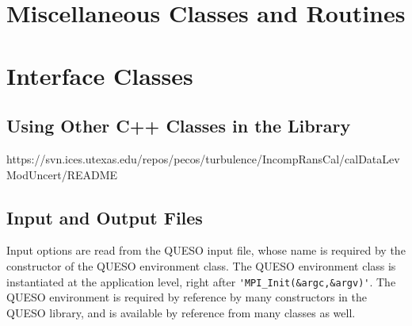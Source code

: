 \section{Miscellaneous Classes and Routines}

\section{Interface Classes}



\subsection{Using Other C++ Classes in the Library}

https://svn.ices.utexas.edu/repos/pecos/turbulence/IncompRansCal/calDataLevModUncert/README


\subsection{Input and Output Files}

Input options are read from the QUESO input file, whose name is required by the constructor of the QUESO environment class.
    The QUESO environment class is instantiated at the application level, right after \verb+'MPI_Init(&argc,&argv)'+. 
    The QUESO environment is required by reference by many constructors in the QUESO library, and is available by reference from many classes as well.
